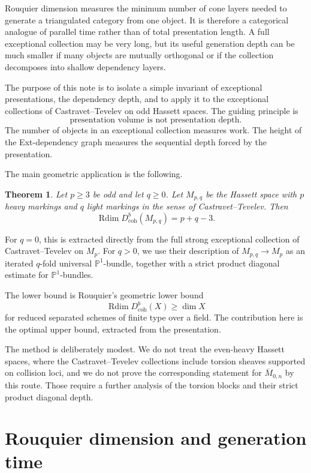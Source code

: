 \documentclass[11pt]{amsart}
\numberwithin{equation}{section}
\newtheorem{theorem}{Theorem}[section]
\theoremstyle{definition}
\DeclareMathOperator{\Rdim}{Rdim}
\newcommand{\Db}{D^b_{\mathrm{coh}}}
\begin{document}
Rouquier dimension measures the minimum number of cone layers needed to generate a triangulated category from one object. It is therefore a categorical analogue of parallel time rather than of total presentation length. A full exceptional collection may be very long, but its useful generation depth can be much smaller if many objects are mutually orthogonal or if the collection decomposes into shallow dependency layers.

The purpose of this note is to isolate a simple invariant of exceptional presentations, the dependency depth, and to apply it to the exceptional collections of Castravet--Tevelev on odd Hassett spaces. The guiding principle is
\[
\text{presentation volume is not presentation depth.}
\]
The number of objects in an exceptional collection measures work. The height of the Ext-dependency graph measures the sequential depth forced by the presentation.

The main geometric application is the following.

\begin{theorem}
Let $p\ge 3$ be odd and let $q\ge0$. Let $M_{p,q}$ be the Hassett space with $p$ heavy markings and $q$ light markings in the sense of Castravet--Tevelev. Then
\[
\Rdim \Db(M_{p,q})=p+q-3.
\]
\end{theorem}

For $q=0$, this is extracted directly from the full strong exceptional collection of Castravet--Tevelev on $M_p$. For $q>0$, we use their description of $M_{p,q}\to M_p$ as an iterated $q$-fold universal $\mathbb P^1$-bundle, together with a strict product diagonal estimate for $\mathbb P^1$-bundles.

The lower bound is Rouquier's geometric lower bound
\[
\Rdim \Db(X)\ge \dim X
\]
for reduced separated schemes of finite type over a field. The contribution here is the optimal upper bound, extracted from the presentation.

The method is deliberately modest. We do not treat the even-heavy Hassett spaces, where the Castravet--Tevelev collections include torsion sheaves supported on collision loci, and we do not prove the corresponding statement for $\overline M_{0,n}$ by this route. Those require a further analysis of the torsion blocks and their strict product diagonal depth.

\section{Rouquier dimension and generation time}
\end{document}
